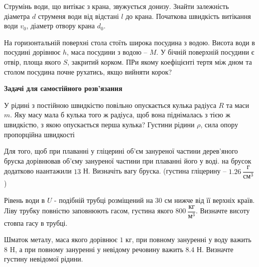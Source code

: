 \begin{problem}{14}
	
	Струмінь води, що витікає з крана, звужується донизу. Знайти залежність діаметра $d$ струменя води від відстані $l$ до крана. Початкова швидкість витікання води $v_0$, діаметр отвору крана $d_0$.
\end{problem}

\begin{problem}{15}
	
	На горизонтальній поверхні стола стоїть широка посудина з водою. Висота води в посудині дорівнює $h$, маса посудини з водою -- $M$. У бічній поверхній посудини є отвір, площа якого $S$, закритий корком. ПРи якому коефіцієнті тертя між дном та столом посудина почне рухатись, якщо вийняти корок?
\end{problem}

\textbf{Задачі для самостійного розв'язання}

\begin{problem}{3}
	У рідині з постійною швидкістю повільно опускається кулька радіуса $R$ та маси $m$. Яку масу мала б кулька того ж радіуса, щоб вона піднімалась з тією ж швидкістю, з якою опускається перша кулька? Густини рідини $\rho$, сила опору пропорційна швидкості
\end{problem}

\begin{problem}{8}
	
	Для того, щоб при плаванні у гліцерині об'єм зануреної частини дерев'яного бруска дорівнював об'єму зануреної частини при плаванні його у воді. на брусок додатково наантажили $13$ Н. Визначіть вагу бруска. (густина гліцерину -- $1.26~\dfrac{\text{г}}{\text{см}^3}$)
\end{problem}

\begin{problem}{9}
	
	Рівень води в $U$ - подібній трубці розміщений на $30$ см нижче від її верхніх країв. Ліву трубку повністю заповнюють гасом, густина якого $800~\dfrac{\text{кг}}{\text{м}^3}$. Визначте висоту стовпа гасу в трубці.
\end{problem}

\begin{problem}{10}
	Шматок металу, маса якого дорівнює $1$ кг, при повному зануренні у воду важить $8$ H, а при повному зануренні у невідому речовину важить $8.4$ Н. Визначте густину невідомої рідини.
\end{problem}

